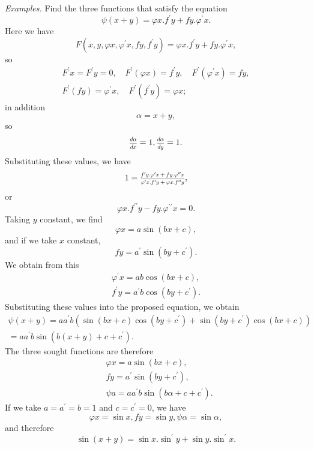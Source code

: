 \documentclass[oneside, 12 pt, leqno]{memoir}
\let\oldfrac\frac
\def\frac#1#2{\mathchoice{\text{\scalebox{.83}{${\oldfrac{#1}{#2}}$}}}{\text{\scalebox{.83}{${\displaystyle\oldfrac{#1}{#2}}$}}}{\genfrac{}{}{}{2}{#1}{#2}}{\genfrac{}{}{}{3}{#1}{#2}}}
\begin{document}
\textit{Examples.} Find the three functions that satisfy the equation
\[\psi(x+y)=\varphi x. f^{\prime} y+f y. \varphi^{\prime} x.\]
Here we have
\[F\left(x, y, \varphi x, \varphi^{\prime} x, f y, f^{\prime} y\right)=\varphi x. f^{\prime} y+f y. \varphi^{\prime} x,\]
so
\[\begin{gathered}
F^{\prime} x=F^{\prime} y=0, \quad F^{\prime}(\varphi x)=f^{\prime} y, \quad F^{\prime}\left(\varphi^{\prime} x\right)=f y,\\
F^{\prime}(f y)=\varphi^{\prime} x, \quad F^{\prime}\left(f^{\prime} y\right)=\varphi x;
\end{gathered}\]
in addition
\[\alpha=x+y,\]
so
\[\frac{d \alpha}{d x}=1, \frac{d \alpha}{d y}=1.\]
Substituting these values, we have
\[1=\frac{f^{\prime} y. \varphi^{\prime} x+f y. \varphi^{\prime \prime} x}{\varphi^{\prime} x. f^{\prime} y+\varphi x. f^{\prime \prime} y},\]
or
\[\varphi x. f^{\prime \prime} y-f y. \varphi^{\prime \prime} x=0.\]
Taking \(y\) constant, we find
\[\varphi x=a \sin (b x+c),\]
and if we take \(x\) constant,
\[f y=a^{\prime} \sin \left(b y+c^{\prime}\right).\]
We obtain from this
\[\begin{gathered}
\varphi^{\prime} x=a b \cos (b x+c), \\
f^{\prime} y=a^{\prime} b \cos \left(b y+c^{\prime}\right).
\end{gathered}\]
Substituting these values into the proposed equation, we obtain
\[\begin{gathered}
\psi(x+y)=a a^{\prime} b\left(\sin (b x+c) \cos \left(b y+c^{\prime}\right)+\sin \left(b y+c^{\prime}\right) \cos (b x+c)\right) \\
=a a^{\prime} b \sin \left(b(x+y)+c+c^{\prime}\right).
\end{gathered}\] 
The three sought functions are therefore
\[\begin{aligned}
& \varphi x=a \sin (b x+c),\\
& f y=a^{\prime} \sin \left(b y+c^{\prime}\right),\\
& \psi a=a a^{\prime} b \sin \left(b \alpha+c+c^{\prime}\right).
\end{aligned}\]
If we take \(a=a^{\prime}=b=1\) and \(c=c^{\prime}=0\), we have
\[\varphi x=\sin x, f y=\sin y, \psi \alpha=\sin \alpha,\]
and therefore
\[ \sin (x+y)=\sin x. \sin ^{\prime} y+\sin y. \sin ^{\prime} x.\]
\end{document}

